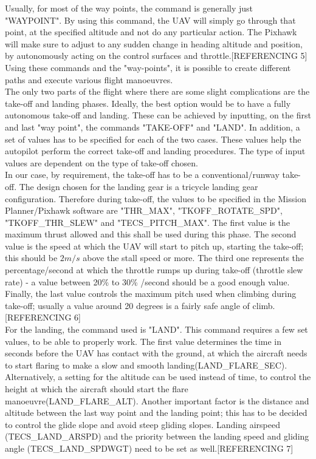 \documentclass[12pt]{article}
\begin{document}
\noindent Usually, for most of the way points, the command is generally just "WAYPOINT". By using this command, the UAV will simply go through that point, at the specified altitude and not do any particular action. The Pixhawk will make sure to adjust to any sudden change in heading altitude and position, by autonomously acting on the control surfaces and throttle.[REFERENCING 5] Using these commands and the "way-points", it is possible to create different paths and execute various flight manoeuvres. \\

\noindent The only two parts of the flight where there are some slight complications are the take-off and landing phases. Ideally, the best option would be to have a fully autonomous take-off and landing. These can be achieved by inputting, on the first and last "way point", the commands "TAKE-OFF" and "LAND". In addition, a set of values has to be specified for each of the two cases. These values help the autopilot perform the correct take-off and landing procedures. The type of input values are dependent on the type of take-off chosen. \\

\noindent In our case, by requirement, the take-off has to be a conventional/runway take-off. The design chosen for the landing gear is a tricycle landing gear configuration. Therefore during take-off, the values to be specified in the Mission Planner/Pixhawk software are "THR\_MAX", "TKOFF\_ROTATE\_SPD", "TKOFF\_THR\_SLEW" and "TECS\_PITCH\_MAX". The first value is the maximum thrust allowed and this shall be used during this phase. The second value is the speed at which the UAV will start to pitch up, starting the take-off; this should be $2m/s$ above the stall speed or more. The third one represents the percentage/second at which the throttle rumps up during take-off (throttle slew rate) - a value between 20\% to 30\% /second should be a good enough value. Finally, the last value controls the maximum pitch used when climbing during take-off; usually a value around 20 degrees is a fairly safe angle of climb.[REFERENCING 6] \\

\noindent For the landing, the command used is "LAND". This command requires a few set values, to be able to properly work. The first value determines the time in seconds before the UAV has contact with the ground, at which the aircraft needs to start flaring to make a slow and smooth landing(LAND\_FLARE\_SEC). Alternatively, a setting for the altitude can be used instead of time, to control the height at which the aircraft should start the flare manoeuvre(LAND\_FLARE\_ALT). Another important factor is the distance and altitude between the last way point and the landing point; this has to be decided to control the glide slope and avoid steep gliding slopes. Landing airspeed (TECS\_LAND\_ARSPD) and the priority between the landing speed and gliding angle (TECS\_LAND\_SPDWGT) need to be set as well.[REFERENCING 7] \\
\end{document}
